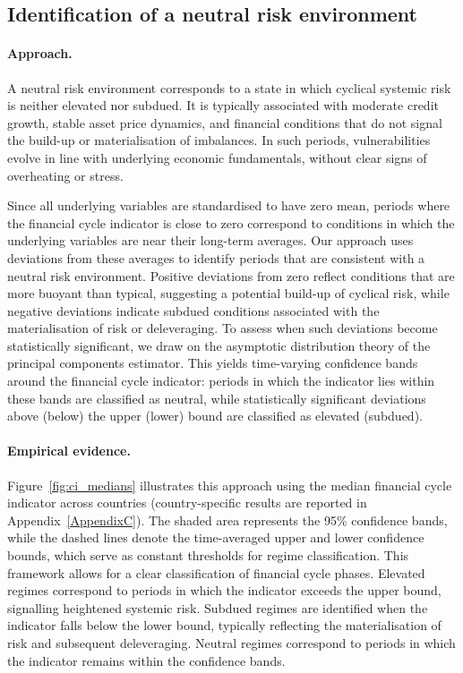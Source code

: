 \subsection{Identification of a neutral risk environment}

\paragraph{Approach.}

A neutral risk environment corresponds to a state in which cyclical systemic risk is neither elevated nor subdued. It is typically associated with moderate credit growth, stable asset price dynamics, and financial conditions that do not signal the build-up or materialisation of imbalances. In such periods, vulnerabilities evolve in line with underlying economic fundamentals, without clear signs of overheating or stress.

Since all underlying variables are standardised to have zero mean, periods where the financial cycle indicator is close to zero correspond to conditions in which the underlying variables are near their long-term averages. Our approach uses deviations from these averages to identify periods that are consistent with a neutral risk environment. Positive deviations from zero reflect conditions that are more buoyant than typical, suggesting a potential build-up of cyclical risk, while negative deviations indicate subdued conditions associated with the materialisation of risk or deleveraging. To assess when such deviations become statistically significant, we draw on the asymptotic distribution theory of the principal components estimator. This yields time-varying confidence bands around the financial cycle indicator: periods in which the indicator lies within these bands are classified as neutral, while statistically significant deviations above (below) the upper (lower) bound are classified as elevated (subdued).

\paragraph{Empirical evidence.}

Figure~\ref{fig:ci_medians} illustrates this approach using the median financial cycle indicator across countries (country-specific results are reported in Appendix~\ref{AppendixC}). The shaded area represents the 95\% confidence bands, while the dashed lines denote the time-averaged upper and lower confidence bounds, which serve as constant thresholds for regime classification. This framework allows for a clear classification of financial cycle phases. Elevated regimes correspond to periods in which the indicator exceeds the upper bound, signalling heightened systemic risk. Subdued regimes are identified when the indicator falls below the lower bound, typically reflecting the materialisation of risk and subsequent deleveraging. Neutral regimes correspond to periods in which the indicator remains within the confidence bands.

